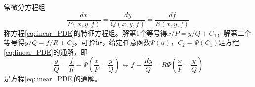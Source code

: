 \documentclass[main.tex]{subfiles}
\begin{document}
常微分方程组
\[
    \frac{dx}{P\left(x,y,f\right)}=\frac{dy}{Q\left(x,y,f\right)}=\frac{df}{R\left(x,y,f\right)}
\]
称方程\eqref{eq:linear_PDE}的特征方程组。解第1个等号得$x/P=y/Q+C_1$，解第二个等号得$y/Q=f/R+C_2$。可验证，给定任意函数$\Psi\left(u\right)$，$C_2=\Psi\left(C_1\right)$是方程\eqref{eq:linear_PDE}的通解，即
\[
    \frac{y}{Q}-\frac{f}{R}=\Psi\left(\frac{x}{P}-\frac{y}{Q}\right)\Leftrightarrow f=\frac{Ry}{Q}-R\Psi\left(\frac{x}{P}-\frac{y}{Q}\right)
\]
是方程\eqref{eq:linear_PDE}的通解。
\end{document}
